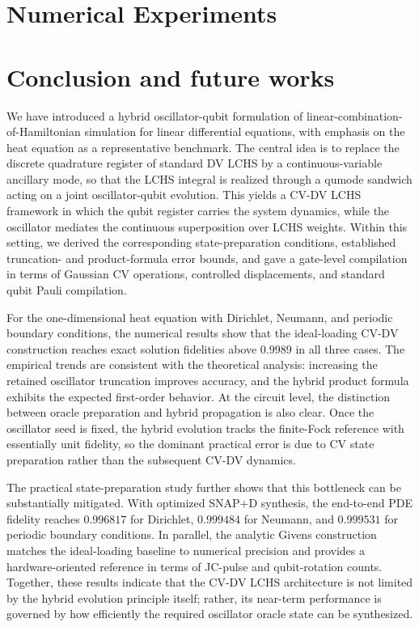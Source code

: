 \documentclass{article}
\begin{document}
\section{Numerical Experiments}
\label{sec:clean_experiments}





\section{Conclusion and future works}

We have introduced a hybrid oscillator-qubit formulation of linear-combination-of-Hamiltonian simulation for linear differential equations, with emphasis on the heat equation as a representative benchmark. 
The central idea is to replace the discrete quadrature register of standard DV LCHS by a continuous-variable ancillary mode, so that the LCHS integral is realized through a qumode sandwich acting on a joint oscillator-qubit evolution. This yields a CV-DV LCHS framework in which the qubit register carries the system dynamics, while the oscillator mediates the continuous superposition over LCHS weights. 
Within this setting, we derived the corresponding state-preparation conditions, established truncation- and product-formula error bounds, and gave a gate-level compilation in terms of Gaussian CV operations, controlled displacements, and standard qubit Pauli compilation.

For the one-dimensional heat equation with Dirichlet, Neumann, and periodic boundary conditions, the numerical results show that the ideal-loading CV-DV construction reaches exact solution fidelities above $0.9989$ in all three cases. The empirical trends are consistent with the theoretical analysis: increasing the retained oscillator truncation improves accuracy, and the hybrid product formula exhibits the expected first-order behavior. At the circuit level, the distinction between oracle preparation and hybrid propagation is also clear. Once the oscillator seed is fixed, the hybrid evolution tracks the finite-Fock reference with essentially unit fidelity, so the dominant practical error is due to CV state preparation rather than the subsequent CV-DV dynamics.

The practical state-preparation study further shows that this bottleneck can be substantially mitigated. With optimized SNAP$+$D synthesis, the end-to-end PDE fidelity reaches $0.996817$ for Dirichlet, $0.999484$ for Neumann, and $0.999531$ for periodic boundary conditions. In parallel, the analytic Givens construction matches the ideal-loading baseline to numerical precision and provides a hardware-oriented reference in terms of JC-pulse and qubit-rotation counts. Together, these results indicate that the CV-DV LCHS architecture is not limited by the hybrid evolution principle itself; rather, its near-term performance is governed by how efficiently the required oscillator oracle state can be synthesized.
\end{document}
